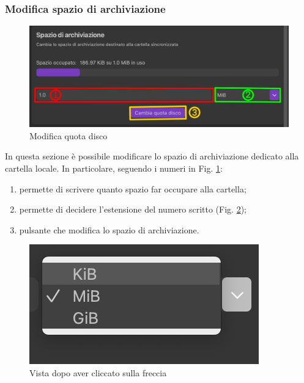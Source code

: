 \subsubsection{Modifica spazio di archiviazione}
\label{sec:quota}
\begin{figure}[H]
    \centering
    \includegraphics[scale = 0.8]{components/img/ImpQuota.png}
    \caption{Modifica quota disco}
    \label{fig:quota}
\end{figure}
In questa sezione è possibile modificare lo spazio di archiviazione dedicato alla cartella locale. In particolare, seguendo i numeri in Fig. \ref{fig:quota}:
\begin{enumerate}
\item permette di scrivere quanto spazio far occupare alla cartella;\
\item permette di decidere l'estensione del numero scritto (Fig. \ref{fig:quotazoom});\
\item pulsante che modifica lo spazio di archiviazione.\
\end{enumerate}
\begin{figure}[H]
    \centering
    \includegraphics[scale = 1]{components/img/ImpQuota2.png}
    \caption{Vista dopo aver cliccato sulla freccia}
    \label{fig:quotazoom}
\end{figure}


